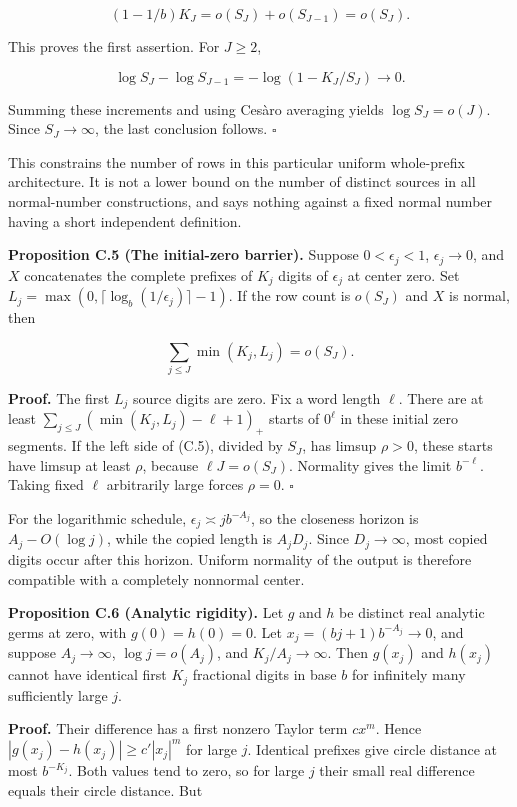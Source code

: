 \documentclass[11pt,a4paper]{article}
\begin{document}
\[
(1-1/b)K_J=o(S_J)+o(S_{J-1})=o(S_J).
\]

This proves the first assertion. For \(J\ge2\),

\[
\log S_J-\log S_{J-1}=-\log(1-K_J/S_J)\longrightarrow0.
\]

Summing these increments and using Cesàro averaging yields
\(\log S_J=o(J)\). Since \(S_J\to\infty\), the last conclusion follows.
\(\square\)

This constrains the number of rows in this particular uniform
whole-prefix architecture. It is not a lower bound on the number of
distinct sources in all normal-number constructions, and says nothing
against a fixed normal number having a short independent definition.

\textbf{Proposition C.5 (The initial-zero barrier).} Suppose
\(0< \epsilon_j< 1\), \(\epsilon_j\to0\), and \(X\) concatenates the
complete prefixes of \(K_j\) digits of \(\epsilon_j\) at center zero.
Set \(L_j=\max(0,\lceil\log_b(1/\epsilon_j)\rceil-1)\). If the row count
is \(o(S_J)\) and \(X\) is normal, then

\[
\sum_{j\le J}\min(K_j,L_j)=o(S_J).
\tag{C.5}
\]

\textbf{Proof.} The first \(L_j\) source digits are zero. Fix a word
length \(\ell\). There are at least
\(\sum_{j\le J}(\min(K_j,L_j)-\ell+1)_+\) starts of \(0^\ell\) in these
initial zero segments. If the left side of (C.5), divided by \(S_J\),
has limsup \(\rho>0\), these starts have limsup at least \(\rho\),
because \(\ell J=o(S_J)\). Normality gives the limit \(b^{-\ell}\).
Taking fixed \(\ell\) arbitrarily large forces \(\rho=0\). \(\square\)

For the logarithmic schedule, \(\epsilon_j\asymp j b^{-A_j}\), so the
closeness horizon is \(A_j-O(\log j)\), while the copied length is
\(A_jD_j\). Since \(D_j\to\infty\), most copied digits occur after this
horizon. Uniform normality of the output is therefore compatible with a
completely nonnormal center.

\textbf{Proposition C.6 (Analytic rigidity).} Let \(g\) and \(h\) be
distinct real analytic germs at zero, with \(g(0)=h(0)=0\). Let
\(x_j=(bj+1)b^{-A_j}\to0\), and suppose \(A_j\to\infty\),
\(\log j=o(A_j)\), and \(K_j/A_j\to\infty\). Then \(g(x_j)\) and
\(h(x_j)\) cannot have identical first \(K_j\) fractional digits in base
\(b\) for infinitely many sufficiently large \(j\).

\textbf{Proof.} Their difference has a first nonzero Taylor term
\(cx^m\). Hence \(|g(x_j)-h(x_j)|\ge c'|x_j|^m\) for large \(j\).
Identical prefixes give circle distance at most \(b^{-K_j}\). Both
values tend to zero, so for large \(j\) their small real difference
equals their circle distance. But
\end{document}
